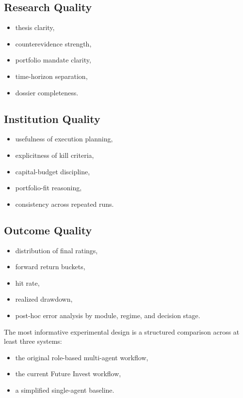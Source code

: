 \documentclass[11pt]{article}
\begin{document}
\subsection{Research Quality}
\begin{itemize}
\item thesis clarity,
\item counterevidence strength,
\item portfolio mandate clarity,
\item time-horizon separation,
\item dossier completeness.
\end{itemize}

\subsection{Institution Quality}
\begin{itemize}
\item usefulness of execution planning,
\item explicitness of kill criteria,
\item capital-budget discipline,
\item portfolio-fit reasoning,
\item consistency across repeated runs.
\end{itemize}

\subsection{Outcome Quality}
\begin{itemize}
\item distribution of final ratings,
\item forward return buckets,
\item hit rate,
\item realized drawdown,
\item post-hoc error analysis by module, regime, and decision stage.
\end{itemize}

The most informative experimental design is a structured comparison across at least three systems:

\begin{itemize}
\item the original role-based multi-agent workflow,
\item the current Future Invest workflow,
\item a simplified single-agent baseline.
\end{itemize}
\end{document}
